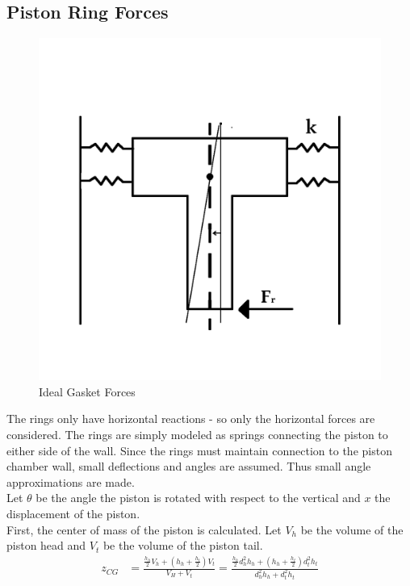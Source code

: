 \documentclass[10pt,a4paper]{article}
\begin{document}
\subsection*{Piston Ring Forces}
	\begin{figure}[h]
		\centering
		\includegraphics[width=.75\textwidth]{PistonDiagram.png}
		\caption{Ideal Gasket Forces}
		\label{fig:diagram1}
	\end{figure}
	The rings only have horizontal reactions - so only the horizontal forces are considered.
	The rings are simply modeled as springs connecting the piston to either side of the wall. Since the rings must maintain connection to the piston chamber wall, small deflections and angles are assumed. Thus small angle approximations are made.\\ Let $\theta$ be the angle the piston is rotated with respect to the vertical and $x$ the displacement of the piston.\\
	First, the center of mass of the piston is calculated. Let $V_h$ be the volume of the piston head and $V_t$ be the volume of the piston tail.
	\begin{align}
		z_{CG} &= \frac{\frac{h_h}{2} V_h + (h_h+ \frac{h_t}{2}) V_t}{V_H + V_t} = \frac{\frac{h_h}{2}d_h^2 h_h + (h_h+ \frac{h_t}{2}) d_t^2 h_t}{d_h^2 h_h + d_t^2 h_t }
	\end{align}
	
\end{document}

